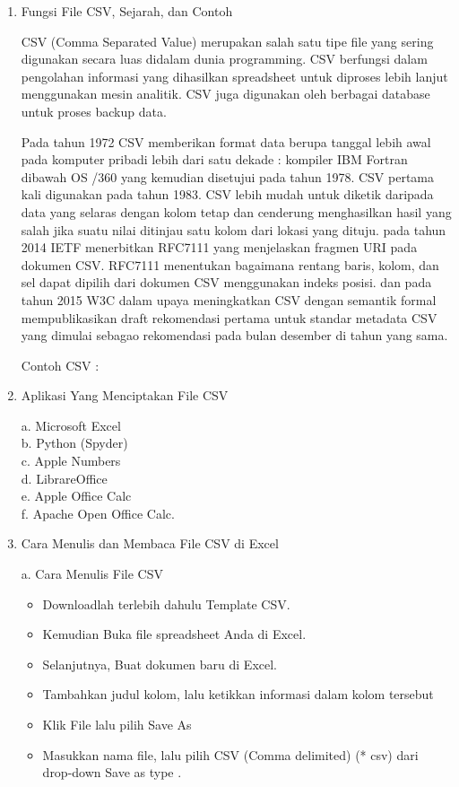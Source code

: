 \begin{enumerate}
\item Fungsi File CSV, Sejarah, dan Contoh

CSV (Comma Separated Value) merupakan salah satu tipe file yang sering digunakan secara luas didalam dunia programming. CSV berfungsi dalam pengolahan informasi yang dihasilkan spreadsheet untuk diproses lebih lanjut menggunakan mesin analitik. CSV juga digunakan oleh berbagai database untuk proses backup data.

Pada tahun 1972 CSV memberikan format data berupa tanggal lebih awal pada komputer pribadi lebih dari satu dekade : kompiler IBM Fortran dibawah OS /360 yang kemudian disetujui pada tahun 1978. CSV pertama kali digunakan pada tahun 1983. CSV lebih mudah untuk diketik daripada data yang selaras dengan kolom tetap dan cenderung menghasilkan hasil yang salah jika suatu nilai ditinjau satu kolom dari lokasi yang dituju. pada tahun 2014 IETF menerbitkan RFC7111 yang menjelaskan fragmen URI pada dokumen CSV. RFC7111 menentukan bagaimana rentang baris, kolom, dan sel dapat dipilih dari dokumen CSV menggunakan indeks posisi. dan pada tahun 2015 W3C dalam upaya meningkatkan CSV dengan semantik formal mempublikasikan draft rekomendasi pertama untuk standar metadata CSV yang dimulai sebagao rekomendasi pada bulan desember di tahun yang sama.

Contoh CSV :\\


\item Aplikasi Yang Menciptakan File CSV

a. Microsoft Excel\\
b. Python (Spyder)\\
c. Apple Numbers\\
d. LibrareOffice\\
e. Apple Office Calc\\
f. Apache Open Office Calc.

\item Cara Menulis dan Membaca File CSV di Excel

a. Cara Menulis File CSV
\begin{itemize}
\item Downloadlah terlebih dahulu Template CSV.
\item Kemudian Buka file spreadsheet Anda di Excel. 
\item Selanjutnya, Buat dokumen baru di Excel.
\item Tambahkan judul kolom, lalu ketikkan informasi dalam kolom tersebut
\item Klik File lalu pilih Save As 
\item Masukkan nama file, lalu pilih CSV (Comma delimited) (* csv) dari drop-down Save as type .
\end{itemize}


\end{enumerate}
